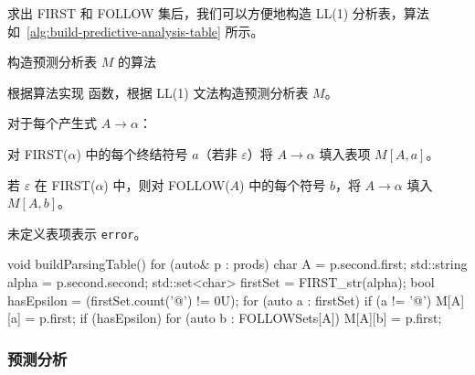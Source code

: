 求出 FIRST 和 FOLLOW 集后，我们可以方便地构造 LL(1) 分析表，算法如~\autoref{alg:build-predictive-analysis-table} 所示。
\begin{algorithm}[htbp]
    \caption{构造预测分析表 $M$ 的算法}
    \label{alg:build-predictive-analysis-table}



\end{algorithm}

根据算法实现  函数，根据 LL(1) 文法构造预测分析表 $M$。

对于每个产生式 $A \to \alpha$：\begin{compactitem}
    \item 对 FIRST($\alpha$) 中的每个终结符号 $a$（若非 $\varepsilon$）将 $A \to \alpha$ 填入表项 $M[A, a]$。
    \item 若 $\varepsilon$ 在 FIRST($\alpha$) 中，则对 FOLLOW($A$) 中的每个符号 $b$，将 $A \to \alpha$ 填入 $M[A, b]$。
\end{compactitem}

未定义表项表示 \texttt{error}。
\begin{cppcode}
void buildParsingTable()
{
    for (auto& p : prods) {
        char A = p.second.first;
        std::string alpha = p.second.second;
        std::set<char> firstSet = FIRST_str(alpha);
        bool hasEpsilon = (firstSet.count('@') != 0U);
        for (auto a : firstSet) {
            if (a != '@') {
                M[A][a] = p.first;
            }
        }
        if (hasEpsilon) {
            for (auto b : FOLLOWSets[A]) {
                M[A][b] = p.first;
            }
        }
    }
}
\end{cppcode}

\subsubsection{预测分析}

